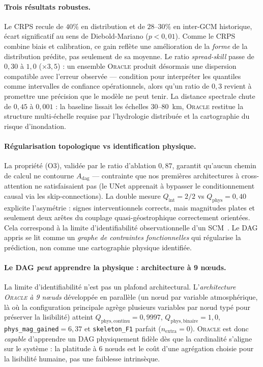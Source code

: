 \documentclass[14pt,a4paper,openany]{extreport}
\newcommand{\Oracle}{\textsc{Oracle}}
\newcommand{\Adag}{\ensuremath{A_{\mathrm{dag}}}}
\begin{document}
\paragraph{Trois résultats robustes.} Le CRPS recule de $40\%$ en distribution et de $28$--$30\%$ en inter-GCM historique, écart significatif au sens de Diebold-Mariano ($p<0{,}01$). Comme le CRPS combine biais et calibration, ce gain reflète une amélioration de la \emph{forme} de la distribution prédite, pas seulement de sa moyenne. Le ratio \emph{spread-skill} passe de $0{,}30$ à $1{,}0$ ($\times 3{,}5$) : un ensemble \Oracle{} produit désormais une dispersion compatible avec l'erreur observée --- condition pour interpréter les quantiles comme intervalles de confiance opérationnels, alors qu'un ratio de $0{,}3$ revient à promettre une précision que le modèle ne peut tenir. La distance spectrale chute de $0{,}45$ à $0{,}001$ : la baseline lissait les échelles $30$--$80$~km, \Oracle{} restitue la structure multi-échelle requise par l'hydrologie distribuée et la cartographie du risque d'inondation.

\paragraph{Régularisation topologique vs identification physique.} La propriété (O3), validée par le ratio d'ablation $0{,}87$, garantit qu'aucun chemin de calcul ne contourne $\Adag$ --- contrainte que nos premières architectures à cross-attention ne satisfaisaient pas (le UNet apprenait à bypasser le conditionnement causal via les skip-connections). La double mesure $Q_{\mathrm{int}}=2/2$ vs $Q_{\mathrm{phys}}=0{,}40$ explicite l'asymétrie : signes interventionnels corrects, mais magnitudes plates et seulement deux arêtes du couplage quasi-géostrophique correctement orientées. Cela correspond à la limite d'identifiabilité observationnelle d'un SCM~\cite{pearl_causality_2009}. Le DAG appris se lit comme un \emph{graphe de contraintes fonctionnelles} qui régularise la prédiction, non comme une cartographie physique identifiée.

\paragraph{Le DAG \emph{peut} apprendre la physique : architecture à 9 nœuds.} La limite d'identifiabilité n'est pas un plafond architectural. L'\emph{architecture \Oracle{} à 9 nœuds} développée en parallèle (un nœud par variable atmosphérique, là où la configuration principale agrège plusieurs variables par nœud typé pour préserver la lisibilité) atteint $Q_{\mathrm{phys},\text{continu}}=0{,}9997$, $Q_{\mathrm{phys},\text{binaire}}=1{,}0$, \texttt{phys\_mag\_gained}$=6{,}37$ et \texttt{skeleton\_F1} parfait ($n_{\mathrm{extra}}=0$). \Oracle{} est donc \emph{capable} d'apprendre un DAG physiquement fidèle dès que la cardinalité s'aligne sur le système : la platitude à 6 nœuds est le coût d'une agrégation choisie pour la lisibilité humaine, pas une faiblesse intrinsèque.
\end{document}
